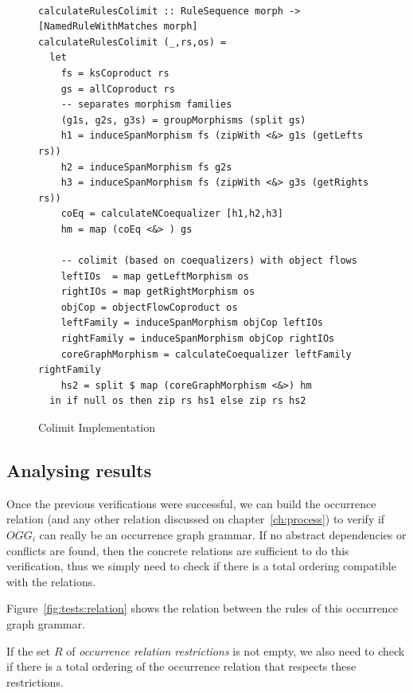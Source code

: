 \begin{figure}[!ht]
\caption{Colimit Implementation}
\begin{verbatim}

calculateRulesColimit :: RuleSequence morph -> [NamedRuleWithMatches morph]
calculateRulesColimit (_,rs,os) =
  let
    fs = ksCoproduct rs
    gs = allCoproduct rs 
    -- separates morphism families
    (g1s, g2s, g3s) = groupMorphisms (split gs)
    h1 = induceSpanMorphism fs (zipWith <&> g1s (getLefts rs))
    h2 = induceSpanMorphism fs g2s
    h3 = induceSpanMorphism fs (zipWith <&> g3s (getRights rs))
    coEq = calculateNCoequalizer [h1,h2,h3]
    hm = map (coEq <&> ) gs
    
    -- colimit (based on coequalizers) with object flows
    leftIOs  = map getLeftMorphism os
    rightIOs = map getRightMorphism os
    objCop = objectFlowCoproduct os
    leftFamily = induceSpanMorphism objCop leftIOs
    rightFamily = induceSpanMorphism objCop rightIOs
    coreGraphMorphism = calculateCoequalizer leftFamily rightFamily
    hs2 = split $ map (coreGraphMorphism <&>) hm
  in if null os then zip rs hs1 else zip rs hs2

\end{verbatim}
\label{fig:tests-colimit}
\end{figure}

\subsection{Analysing results}

Once the previous verifications were successful, we can build the occurrence relation (and any other relation discussed on chapter~\ref{ch:process}) to verify if $OGG_i$ can really be an occurrence graph grammar. If no abstract dependencies or conflicts are found, then the concrete relations are sufficient to do this verification, thus we simply need to check if there is a total ordering compatible with the relations.

\begin{example} Figure~\ref{fig:tests:relation} shows the relation between the rules of this occurrence graph grammar.
\end{example}

If the set $R$ of \emph{occurrence relation restrictions} is not empty, we also need to check if there is a total ordering of the occurrence relation that respects these restrictions.

